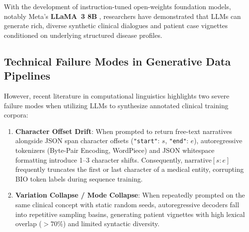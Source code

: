\begin{sloppypar}
With the development of instruction-tuned open-weights foundation models, notably Meta's \textbf{LLaMA~3 8B} \cite{Touvron2023_LLaMA, Meta2024_LLaMA3}, researchers have demonstrated that LLMs can generate rich, diverse synthetic clinical dialogues and patient case vignettes conditioned on underlying structured disease profiles.

\subsection{Technical Failure Modes in Generative Data Pipelines}
However, recent literature in computational linguistics highlights two severe failure modes when utilizing LLMs to synthesize annotated clinical training corpora:
\begin{enumerate}
    \item \textbf{Character Offset Drift}: When prompted to return free-text narratives alongside JSON span character offsets (\texttt{"start"}: $s$, \texttt{"end"}: $e$), autoregressive tokenizers (Byte-Pair Encoding, WordPiece) and JSON whitespace formatting introduce 1--3 character shifts. Consequently, $\text{narrative}[s:e]$ frequently truncates the first or last character of a medical entity, corrupting BIO token labels during sequence training.
    \item \textbf{Variation Collapse / Mode Collapse}: When repeatedly prompted on the same clinical concept with static random seeds, autoregressive decoders fall into repetitive sampling basins, generating patient vignettes with high lexical overlap ($> 70\%$) and limited syntactic diversity.
\end{enumerate}


\end{sloppypar}
